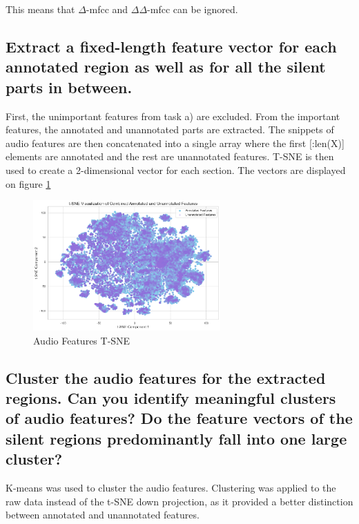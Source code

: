 This means that $\Delta$-mfcc and $\Delta\Delta$-mfcc can be ignored.

\subsection{Extract a fixed-length feature vector for each annotated region as well as for all the silent parts in between. }
\label{sec:Audio Features:b}

First, the unimportant features from task a) are excluded. From the important features, the annotated and unannotated parts are extracted.
The snippets of audio features are then concatenated into a single array where the first [:len(X)] elements are annotated and the rest are unannotated features. T-SNE is then used to create a 2-dimensional vector for each section. The vectors are displayed on figure \ref{fig:Audio Features T-SNE} 


\begin{figure}[htbp]
    \centering
    \includegraphics[width=0.5\linewidth, height=5cm]{figs/Audio Features T-SNE.png}
    \caption{Audio Features T-SNE}
    \label{fig:Audio Features T-SNE}
\end{figure}


\subsection{Cluster the audio features for the extracted regions. Can you identify meaningful clusters of audio features? Do the feature vectors of the silent regions predominantly fall into one large cluster?}
\label{sec:Audio Features:c}

K-means was used to cluster the audio features. Clustering was applied to the raw data instead of the t-SNE down projection, as it provided a better distinction between annotated and unannotated features.

\pagebreak

